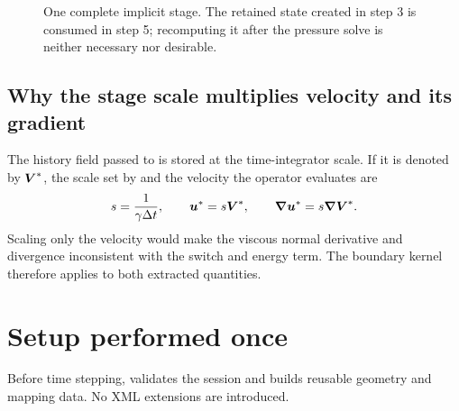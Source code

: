 \begin{figure}[p]
{}
\caption{One complete implicit stage.  The retained state created in step 3
is consumed in step 5; recomputing it after the pressure solve is neither
necessary nor desirable.}
\label{houtflow:fig:stage}
\end{figure}

\subsection{Why the stage scale multiplies velocity and its gradient}

The history field passed to  is stored at the
time-integrator scale.  If it is denoted by $\boldsymbol{V}^*$, the scale set by
 and the velocity the operator evaluates are
\begin{equation}
  s=\frac{1}{\gamma\Delta t},\qquad
  \boldsymbol{u}^*=s\boldsymbol{V}^*,\qquad
  \boldsymbol{\nabla}\boldsymbol{u}^*=s\boldsymbol{\nabla}\boldsymbol{V}^*.
\end{equation}
Scaling only the velocity would make the viscous normal derivative and
divergence inconsistent with the switch and energy term.  The boundary
kernel therefore applies  to both extracted quantities.

\section{Setup performed once}

Before time stepping,  validates the session and
builds reusable geometry and mapping data.  No XML extensions are introduced.


